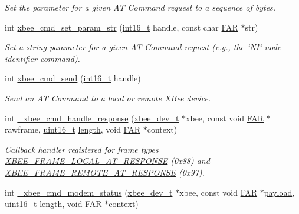 \begin{DoxyCompactItemize}
\begin{DoxyCompactList}\small\item\em Set the parameter for a given A\-T Command request to a sequence of bytes. \end{DoxyCompactList}\item 
int \hyperlink{group__xbee__atcmd_ga5b69459e7c47be384c9add2921e507e0}{xbee\-\_\-cmd\-\_\-set\-\_\-param\-\_\-str} (\hyperlink{group__hal_ga2140805d08462d474b82ddc8d1c2f3e6}{int16\-\_\-t} handle, const char \hyperlink{group__hal_gaef060b3456fdcc093a7210a762d5f2ed}{F\-A\-R} $\ast$str)
\begin{DoxyCompactList}\small\item\em Set a string parameter for a given A\-T Command request (e.\-g., the \char`\"{}\-N\-I\char`\"{} node identifier command). \end{DoxyCompactList}\item 
int \hyperlink{group__xbee__atcmd_ga2c58eedef60b41dd30ae1f6b475606a8}{xbee\-\_\-cmd\-\_\-send} (\hyperlink{group__hal_ga2140805d08462d474b82ddc8d1c2f3e6}{int16\-\_\-t} handle)
\begin{DoxyCompactList}\small\item\em Send an A\-T Command to a local or remote X\-Bee device. \end{DoxyCompactList}\item 
int \hyperlink{group__xbee__atcmd_ga3b4559f4e729b1c96f5c0d9e4476aa7d}{\-\_\-xbee\-\_\-cmd\-\_\-handle\-\_\-response} (\hyperlink{structxbee__dev__t}{xbee\-\_\-dev\-\_\-t} $\ast$xbee, const void \hyperlink{group__hal_gaef060b3456fdcc093a7210a762d5f2ed}{F\-A\-R} $\ast$rawframe, \hyperlink{group__hal_ga5a8b2dc9e45a9ee81a94ef304fb62505}{uint16\-\_\-t} \hyperlink{group__zdo_gab2b3adeb2a67e656ff030b56727fd0ac}{length}, void \hyperlink{group__hal_gaef060b3456fdcc093a7210a762d5f2ed}{F\-A\-R} $\ast$context)
\begin{DoxyCompactList}\small\item\em Callback handler registered for frame types \hyperlink{group__xbee__device_gga7753bbebaf00d6d64942f64b6ae9b7b9ae66771334070219cd098c8201936cf4a}{X\-B\-E\-E\-\_\-\-F\-R\-A\-M\-E\-\_\-\-L\-O\-C\-A\-L\-\_\-\-A\-T\-\_\-\-R\-E\-S\-P\-O\-N\-S\-E} (0x88) and \hyperlink{group__xbee__device_gga7753bbebaf00d6d64942f64b6ae9b7b9a3cd726459592fab4cdc9b5e6bbecb79f}{X\-B\-E\-E\-\_\-\-F\-R\-A\-M\-E\-\_\-\-R\-E\-M\-O\-T\-E\-\_\-\-A\-T\-\_\-\-R\-E\-S\-P\-O\-N\-S\-E} (0x97). \end{DoxyCompactList}\item 
int \hyperlink{group__xbee__atcmd_ga9b0ddf7aae7599dc334304f2b642f05f}{\-\_\-xbee\-\_\-cmd\-\_\-modem\-\_\-status} (\hyperlink{structxbee__dev__t}{xbee\-\_\-dev\-\_\-t} $\ast$xbee, const void \hyperlink{group__hal_gaef060b3456fdcc093a7210a762d5f2ed}{F\-A\-R} $\ast$\hyperlink{group__zcl_gacb1403989580c30b5cac60f347c5d6ab}{payload}, \hyperlink{group__hal_ga5a8b2dc9e45a9ee81a94ef304fb62505}{uint16\-\_\-t} \hyperlink{group__zdo_gab2b3adeb2a67e656ff030b56727fd0ac}{length}, void \hyperlink{group__hal_gaef060b3456fdcc093a7210a762d5f2ed}{F\-A\-R} $\ast$context)

\end{DoxyCompactItemize}

